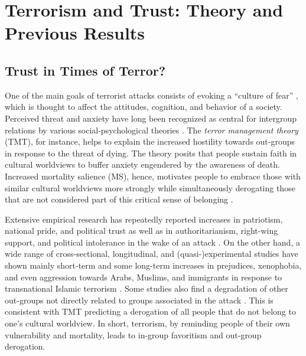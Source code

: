 \section{Terrorism and Trust: Theory and Previous Results}
\subsection{Trust in Times of Terror?}
One of the main goals of terrorist attacks consists of evoking a ``culture of fear'' \citep{Arvanitidis2016}, which is thought to affect the attitudes, cognition, and behavior of a society. Perceived threat and anxiety have long been recognized as central for intergroup relations by various social-psychological theories \citep{Quillian1995, Stephan2000}. The \textit{terror management theory} (TMT), for instance, helps to explain the increased hostility towards out-groups in response to the threat of dying. The theory posits that people sustain faith in cultural worldviews to buffer anxiety engendered by the awareness of death. Increased mortality salience (MS), hence, motivates people to embrace those with similar cultural worldviews more strongly while simultaneously derogating those that are not considered part of this critical sense of belonging \citep{Pyszczynski2003}.


Extensive empirical research has repeatedly reported increases in patriotism, national pride, and political trust as well as in authoritarianism, right-wing support, and political intolerance in the wake of an attack \citep[e.g.,][]{Cohrs2005a, Echebarria-Echabe2009, Skitka2004a, Vergani2016}. On the other hand, a wide range of cross-sectional, longitudinal, and (quasi-)experimental studies have shown mainly short-term and some long-term increases in prejudices, xenophobia, and even aggression towards Arabs, Muslims, and immigrants in response to transnational Islamic terrorism \citep[e.g.,][]{Argyrides2004, Ciftci2012, Field2007, Hopkins2010a, Huddy2002, Legewie2013, Panagopoulos2006}. Some studies also find a degradation of other out-groups not directly related to groups associated in the attack \citep[against jews, for instance, in][]{Echebarria-Echabe2009}. This is consistent with TMT predicting a derogation of all people that do not belong to one’s cultural worldview. In short, terrorism, by reminding people of their own vulnerability and mortality, leads to in-group favoritism and out-group derogation.



